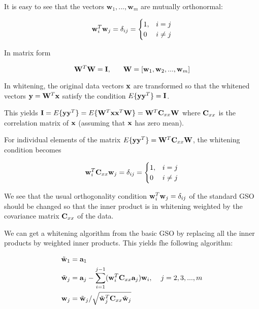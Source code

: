 \begin{enumerate}
\begin{solution}
\begin{enumerate}
      It is easy to see that the vectors $\textbf{w}_1, ...,
      \textbf{w}_m$ are mutually orthonormal:

      \[\mathbf{w}_i^T\mathbf{w}_j = \delta_{ij} = \begin{cases}1, &i=j\\0 &i\neq
        j\end{cases}
      \]

      In matrix form

      \[
      \mathbf{W}^T\mathbf{W} = \mathbf{I}, \hspace{6mm}\mathbf{W} =
      [\mathbf{w}_1, \mathbf{w}_2, ..., \mathbf{w}_m]
      \]

      In whitening, the original data vectors $\mathbf{x}$ are transformed
      so that the whitened vectors $\textbf{y}=\mathbf{W}^T\mathbf{x}$
      satisfy the condition $E\lbrace \textbf{y}\textbf{y}^T
      \rbrace=\mathbf{I}$.

      This yields $\mathbf{I} = E\lbrace \textbf{y}\textbf{y}^T \rbrace
      = E\lbrace \mathbf{W}^T\mathbf{x}\mathbf{x}^T\mathbf{W}\rbrace=\mathbf{W}^T
      \textbf{C}_{xx} \mathbf{W}$ where $\mathbf{C}_{xx}$ is the correlation
      matrix of $\mathbf{x}$ (assuming that $\mathbf{x}$ has zero mean).

      For individual elements of the matrix $E\lbrace
      \mathbf{y}\mathbf{y}^T\rbrace=\mathbf{W}^T\mathbf{C}_{xx}\mathbf{W}$, the
      whitening condition becomes

      \[
      \mathbf{w}_i^T\mathbf{C}_{xx}\mathbf{w}_j = \delta_{ij}
      = \begin{cases}1, &i=j\\0 &i\neq j\end{cases}
      \]


      We see that the usual orthogonality condition
      $\mathbf{w}_i^T\mathbf{w}_j = \delta_{ij}$ of the standard GSO
      should be changed so that the inner product is in whitening
      weighted by the covariance matrix $\mathbf{C}_{xx}$ of the data.

      We can get a whitening algorithm from the basic GSO by replacing
      all the inner products by weighted inner products. This yields
      fhe following algorithm:

      \[
      \begin{split}
        \tilde{\mathbf{w}}_1 &= \mathbf{a}_1 \\
        \tilde{\mathbf{w}}_j &= \mathbf{a}_j - \sum_{i=1}^{j-1}
        (\mathbf{w}_i^T\mathbf{C}_{xx}\mathbf{a}_j)\mathbf{w}_i, \hspace{4mm} j=2,3,...,m \\
        \mathbf{w}_j &= \tilde{\mathbf{w}}_j/\sqrt{\tilde{\mathbf{w}}_j^T\mathbf{C}_{xx}\tilde{\mathbf{w}}_j}
      \end{split}
      \]


\end{enumerate}
\end{solution}
\end{enumerate}

